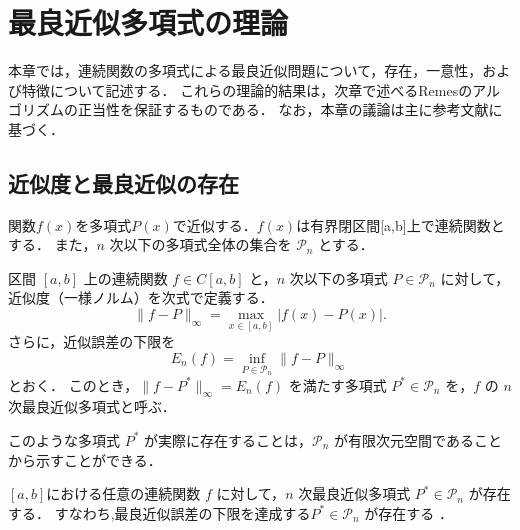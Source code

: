 \section{最良近似多項式の理論} %
\label{sec:best_approximation_theory}
  本章では，連続関数の多項式による最良近似問題について，存在，一意性，および特徴について記述する．
  これらの理論的結果は，次章で述べるRemesのアルゴリズムの正当性を保証するものである．
  なお，本章の議論は主に参考文献\cite{seminar-note}に基づく．

  \subsection{近似度と最良近似の存在}
   \label{subsec:approximation_error}
    関数$f(x)$を多項式$P(x)$で近似する．$f(x)$は有界閉区間[a,b]上で連続関数とする．
    また，$n$ 次以下の多項式全体の集合を $\mathcal{P}_n$ とする．

    \begin{definition}[最良近似多項式]
    \label{def:best_approximation_poly}
    区間 $[a, b]$ 上の連続関数 $f \in C[a, b]$ と，$n$ 次以下の多項式 $P \in \mathcal{P}_n$ に対して，近似度（一様ノルム）を次式で定義する．
    \begin{equation}
      \| f - P\|_\infty = \max_{x \in [a, b]} |f(x) - P(x)|.
      \label{eq:uniform_norm}
    \end{equation}
    さらに，近似誤差の下限を
    \begin{equation}
      E_n(f) = \inf_{P \in \mathcal{P}_n} \| f - P \|_\infty
      \label{eq:best_approx_error}
    \end{equation}
    とおく． このとき，$\| f - P^* \|_\infty = E_n(f)$ を満たす多項式 $P^* \in \mathcal{P}_n$ を，$f$ の $n$ 次最良近似多項式と呼ぶ．
    \end{definition}

    このような多項式 $P^*$ が実際に存在することは，$\mathcal{P}_n$ が有限次元空間であることから示すことができる．

    \begin{theorem}[最良近似多項式の存在]
      \label{thm:existence}
      $[a, b]$における任意の連続関数 $f$ に対して，$n$ 次最良近似多項式 $P^* \in \mathcal{P}_n$ が存在する．
      すなわち,最良近似誤差の下限を達成する$P^* \in \mathcal{P}_n$ が存在する
      ．
    \end{theorem}

